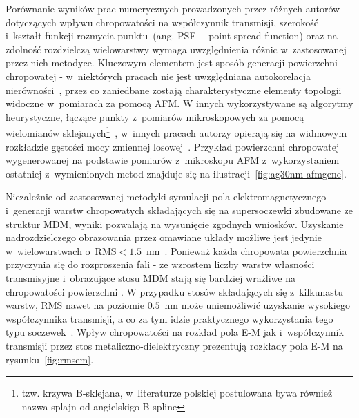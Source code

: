 Porównanie wyników prac numerycznych prowadzonych przez różnych autorów dotyczących wpływu chropowatości na współczynnik transmisji, szerokość i~kształt funkcji rozmycia punktu~(ang. PSF~-~point spread function) oraz na zdolność rozdzielczą wielowarstwy wymaga uwzględnienia różnic w~zastosowanej przez nich metodyce. Kluczowym elementem jest sposób generacji powierzchni chropowatej - w~niektórych pracach nie jest uwzględniana autokorelacja nierówności~\cite{guo2014negative}, przez co zaniedbane zostają charakterystyczne elementy topologii widoczne w~pomiarach za pomocą AFM. W innych wykorzystywane są algorytmy heurystyczne, łączące punkty z~pomiarów mikroskopowych za pomocą wielomianów sklejanych\footnote{tzw. krzywa B-sklejana, w~literaturze polskiej postulowana bywa również nazwa splajn od angielskigo B-spline}~\cite{ludwig2012impact}, w~innych pracach autorzy opierają się na widmowym rozkładzie gęstości mocy zmiennej losowej~\cite{pastuszczak2013engineering}. Przykład powierzchni chropowatej wygenerowanej na podstawie pomiarów z~mikroskopu AFM z~wykorzystaniem ostatniej z~wymienionych metod znajduje się na ilustracji~\ref{fig:ag30nm-afmgene}.

Niezależnie od zastosowanej metodyki symulacji pola elektromagnetycznego i~generacji warstw chropowatych składających się na supersoczewki zbudowane ze struktur MDM, wyniki pozwalają na wysunięcie zgodnych wniosków. Uzyskanie nadrozdzielczego obrazowania przez omawiane układy  możliwe jest jedynie w~wielowarstwach o~RMS$<1.5$~nm~\citep{guo2014negative,stefaniuk2011effect,ludwig2012impact}. Ponieważ każda chropowata powierzchnia przyczynia się do rozproszenia fali -  ze wzrostem liczby warstw własności transmisyjne i~obrazujące stosu MDM stają się bardziej wrażliwe na chropowatości powierzchni \cite{guo2014negative}. W przypadku stosów składających się z~kilkunastu warstw, RMS nawet na poziomie $0.5$~nm może uniemożliwić uzyskanie wysokiego współczynnika transmisji, a co za tym idzie praktycznego wykorzystania tego typu soczewek~\cite{pastuszczak2013engineering}. Wpływ chropowatości na rozkład pola E-M jak i~współczynnik transmisji przez stos metaliczno-dielektryczny prezentują rozkłady pola E-M na rysunku~\ref{fig:rmsem}.








